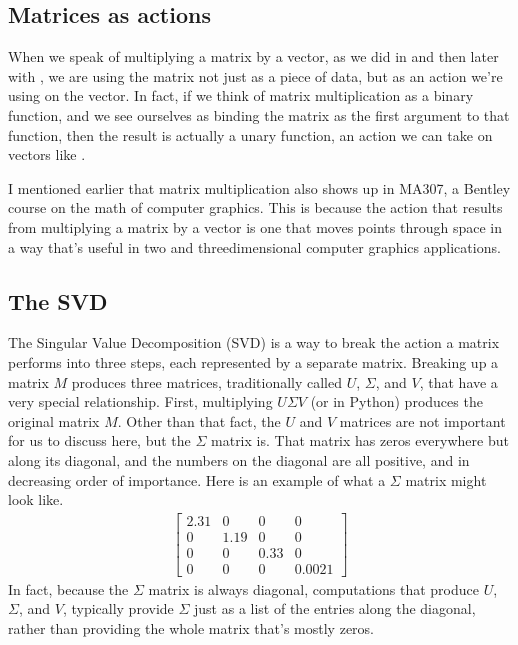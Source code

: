 \documentclass[letterpaper,10pt,english]{jupyterBook}
\begin{document}
\subsection{Matrices as actions}
\label{\detokenize{chapter-16-matrices:matrices-as-actions}}
\sphinxAtStartPar
When we speak of multiplying a matrix by a vector, as we did in  and then later with , we are using the matrix not just as a piece of data, but as an action we’re using on the vector.  In fact, if we think of matrix multiplication as a binary function, and we see ourselves as binding the matrix as the first argument to that function, then the result is actually a unary function, an action we can take on vectors like .

\sphinxAtStartPar
I mentioned earlier that matrix multiplication also shows up in MA307, a Bentley course on the math of computer graphics.  This is because the action that results from multiplying a matrix by a vector is one that moves points through space in a way that’s useful in two\sphinxhyphen{} and three\sphinxhyphen{}dimensional computer graphics applications.


\subsection{The SVD}
\label{\detokenize{chapter-16-matrices:the-svd}}
\sphinxAtStartPar
The Singular Value Decomposition (SVD) is a way to break the action a matrix performs into three steps, each represented by a separate matrix.  Breaking up a matrix \(M\) produces three matrices, traditionally called \(U\), \(\Sigma\), and \(V\), that have a very special relationship.  First, multiplying \(U\Sigma V\) (or  in Python) produces the original matrix \(M\).  Other than that fact, the \(U\) and \(V\) matrices are not important for us to discuss here, but the \(\Sigma\) matrix is.  That matrix has zeros everywhere but along its diagonal, and the numbers on the diagonal are all positive, and in decreasing order of importance.  Here is an example of what a \(\Sigma\) matrix might look like.
\begin{equation*}
\begin{split} \left[\begin{array}{cccc} 2.31 & 0 & 0 & 0 \\ 0 & 1.19 & 0 & 0 \\ 0 & 0 & 0.33 & 0 \\ 0 & 0 & 0 & 0.0021 \end{array}\right]\end{split}
\end{equation*}
\sphinxAtStartPar
In fact, because the \(\Sigma\) matrix is always diagonal, computations that produce \(U\), \(\Sigma\), and \(V\), typically provide \(\Sigma\) just as a list of the entries along the diagonal, rather than providing the whole matrix that’s mostly zeros.
\end{document}

